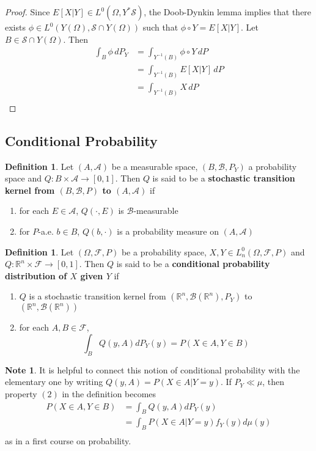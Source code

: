 \documentclass[12pt]{amsart}
\theoremstyle{definition}
\newtheorem{defn}[definition]{Definition}
\newtheorem{note}[definition]{Note}
\newcommand{\Om}{\Omega}
\newcommand{\R}{\mathbb{R}}
\newcommand{\MA}{\mathcal{A}}
\newcommand{\MB}{\mathcal{B}}
\newcommand{\MF}{\mathcal{F}}
\newcommand{\MS}{\mathcal{S}}
\newcommand{\dP}{\, d P}
\begin{document}
	\begin{proof}
	Since $E[X| Y] \in L^0(\Om, Y^*\MS)$, the Doob-Dynkin lemma implies that there exists $\phi \in L^0(Y(\Om), \MS \cap Y(\Om))$ such that $\phi \circ Y = E[X|Y]$. Let $B \in \MS \cap Y(\Om)$. Then 
	\begin{align*}
	\int_B \phi \dP_Y
	&= \int_{Y^{-1}(B)} \phi \circ Y \dP \\
	&= \int_{Y^{-1}(B)} E[X|Y] \dP \\
	&= \int_{Y^{-1}(B)} X \dP \\
	\end{align*}
	\end{proof}
	
	
	
	\subsection{Conditional Probability}
	
	\begin{defn}
	Let $(A, \MA)$ be a measurable space, $(B, \MB, P_Y)$ a probability space and $Q:B \times \MA \rightarrow [0,1]$. Then $Q$ is said to be a \textbf{stochastic transition kernel from $(B, \MB, P)$ to $(A, \MA)$} if 
	\begin{enumerate}
	\item for each $E \in \MA$, $Q(\cdot, E)$ is $\MB$-measurable
	\item for $P$-a.e. $b \in B$, $Q(b, \cdot)$ is a probability measure on $(A, \MA)$
	\end{enumerate}
	\end{defn}	
	
	\begin{defn}
	Let $(\Om, \MF, P)$ be a probability space, $X,Y \in L_n^0(\Om, \MF, P)$ and $Q: \R^n  \times \MF \rightarrow [0,1]$. Then $Q$ is said to be a \textbf{conditional probability distribution of $X$ given $Y$} if 
	\begin{enumerate}
	\item $Q$ is a stochastic transition kernel from $(\R^n, \MB(\R^n), P_Y)$ to $(\R^n, \MB(\R^n))$
	\item for each $A,B \in \MF$, $$\int_B Q(y, A) dP_Y(y) = P(X \in A, Y \in B)$$ 
	\end{enumerate}
	\end{defn}
	
	\begin{note}
	It is helpful to connect this notion of conditional probability with the elementary one by writing $Q(y, A) = P(X \in A| Y = y)$. If $P_Y \ll \mu$, then property $(2)$ in the definition becomes 
	\begin{align*}
	P(X \in A, Y \in B)  
	&=  \int_B Q(y, A) dP_Y(y) \\
	&= \int_B P(X \in A|Y=y) f_Y(y)d \mu(y) \\
\end{align*}	 
	as in a first course on probability.
	\end{note}	
	
\end{document}
